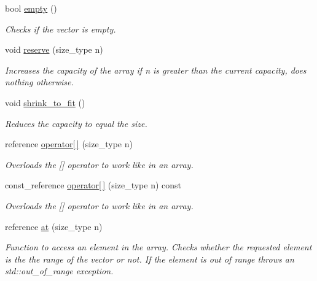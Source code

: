 \begin{DoxyCompactItemize}
bool \mbox{\hyperlink{classfake_1_1vector_adbbc8fb5844444c3d4d9d633aa4194d2}{empty}} ()
\begin{DoxyCompactList}\small\item\em Checks if the vector is empty. \end{DoxyCompactList}\item 
void \mbox{\hyperlink{classfake_1_1vector_a1390854cc51f7b83f4b871fe84b8015b}{reserve}} (size\+\_\+type n)
\begin{DoxyCompactList}\small\item\em Increases the capacity of the array if n is greater than the current capacity, does nothing otherwise. \end{DoxyCompactList}\item 
\mbox{\label{classfake_1_1vector_a73ced26188db838294c117fc228aedb6}} 
void \mbox{\hyperlink{classfake_1_1vector_a73ced26188db838294c117fc228aedb6}{shrink\+\_\+to\+\_\+fit}} ()
\begin{DoxyCompactList}\small\item\em Reduces the capacity to equal the size. \end{DoxyCompactList}\item 
reference \mbox{\hyperlink{classfake_1_1vector_aec71da0fa184c234784f6895d8945d03}{operator\mbox{[}$\,$\mbox{]}}} (size\+\_\+type n)
\begin{DoxyCompactList}\small\item\em Overloads the \mbox{[}\mbox{]} operator to work like in an array. \end{DoxyCompactList}\item 
const\+\_\+reference \mbox{\hyperlink{classfake_1_1vector_aabd2d9852edba68b74b45a0309583b9e}{operator\mbox{[}$\,$\mbox{]}}} (size\+\_\+type n) const
\begin{DoxyCompactList}\small\item\em Overloads the \mbox{[}\mbox{]} operator to work like in an array. \end{DoxyCompactList}\item 
reference \mbox{\hyperlink{classfake_1_1vector_a1d69cf8d74039554ccde03a0be71ef14}{at}} (size\+\_\+type n)
\begin{DoxyCompactList}\small\item\em Function to access an element in the array. Checks whether the requested element is the the range of the vector or not. If the element is out of range throws an std\+::out\+\_\+of\+\_\+range exception. \end{DoxyCompactList}\item 

\end{DoxyCompactItemize}
